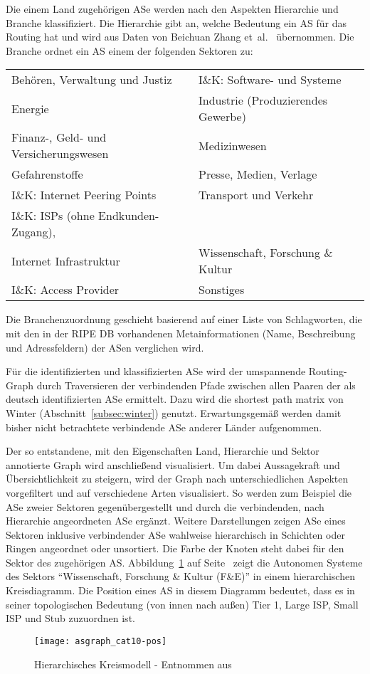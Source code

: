 Die einem Land zugehörigen ASe werden nach den Aspekten Hierarchie und Branche klassifiziert.
Die Hierarchie gibt an, welche Bedeutung ein AS für das Routing hat und wird aus Daten von Beichuan Zhang et~al.~\cite{Zhang:2005:CIA:1052812.1052825} übernommen.
Die Branche ordnet ein AS einem der folgenden Sektoren zu:
\begin{center}
  \begin{tabular}[h]{ll}
    \hline
    Behören, Verwaltung und Justiz & I\&K: Software- und Systeme \\
    Energie & Industrie (Produzierendes Gewerbe) \\
    Finanz-, Geld- und Versicherungswesen & Medizinwesen \\
    Gefahrenstoffe & Presse, Medien, Verlage \\
    I\&K: Internet Peering Points & Transport und Verkehr \\
    I\&K: ISPs (ohne Endkunden-Zugang),\\
    Internet Infrastruktur & Wissenschaft, Forschung \& Kultur \\
    I\&K: Access Provider & Sonstiges \\
    \hline
  \end{tabular}
\end{center}
Die Branchenzuordnung geschieht basierend auf einer Liste von Schlagworten, die mit den in der RIPE DB vorhandenen Metainformationen (Name, Beschreibung und Adressfeldern) der ASen verglichen wird.

Für die identifizierten und klassifizierten ASe wird der umspannende Routing-Graph durch Traversieren der verbindenden Pfade zwischen allen Paaren der als deutsch identifizierten ASe ermittelt.
Dazu wird die shortest path matrix von Winter (\vgl Abschnitt~\ref{subsec:winter}) genutzt.
Erwartungsgemäß werden damit bisher nicht betrachtete verbindende ASe anderer Länder aufgenommen.

Der so entstandene, mit den Eigenschaften Land, Hierarchie und Sektor annotierte Graph wird anschließend visualisiert.
Um dabei Aussagekraft und Übersichtlichkeit zu steigern, wird der Graph nach unterschiedlichen Aspekten vorgefiltert und auf verschiedene Arten visualisiert.
So werden zum Beispiel die ASe zweier Sektoren gegenübergestellt und durch die verbindenden, nach Hierarchie angeordneten ASe ergänzt.
Weitere Darstellungen zeigen ASe eines Sektoren inklusive verbindender ASe wahlweise hierarchisch in Schichten oder Ringen angeordnet oder unsortiert.
Die Farbe der Knoten steht dabei für den Sektor des zugehörigen AS.
Abbildung~\ref{fig:asgraph_cat10} auf Seite~\pageref{fig:asgraph_cat10} zeigt die Autonomen Systeme des Sektors "`Wissenschaft, Forschung \& Kultur (F\&E)"' in einem hierarchischen Kreisdiagramm.
Die Position eines AS in diesem Diagramm bedeutet, dass es in seiner topologischen Bedeutung (von innen nach außen) Tier 1, Large ISP, Small ISP und Stub zuzuordnen ist.

\begin{figure}
  \begin{center}
  \texttt{[image: asgraph\_cat10-pos]}
  \caption{Hierarchisches Kreismodell - Entnommen aus~\cite{swbh-rsved-11}} \label{fig:asgraph_cat10}
  \end{center}
\end{figure}
